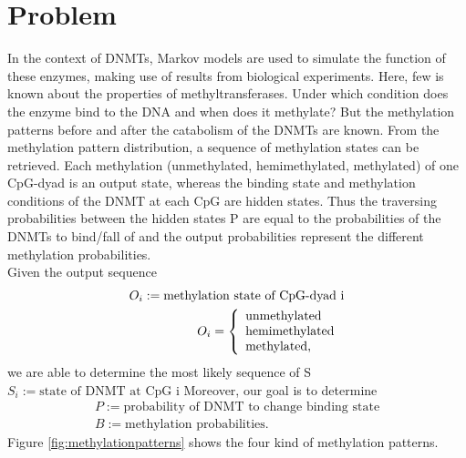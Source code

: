 \section{Problem} 
\label{section:Problem}
In the context of \acp{DNMT}, Markov models are used to simulate the function of these enzymes, making use of results from biological experiments. Here, few is known about the properties of methyltransferases. Under which condition does the enzyme bind to the DNA and when does it methylate? But the methylation patterns before and after the catabolism of the \acp{DNMT} are known. From the methylation pattern distribution, a sequence of methylation states can be retrieved. Each methylation (unmethylated, hemimethylated, methylated) of one \ac{CpG}-dyad is an output state, whereas the binding state and methylation conditions of the \ac{DNMT} at each \ac{CpG} are hidden states. Thus the traversing probabilities between the hidden states P are equal to the probabilities of the \acp{DNMT} to bind/fall of and the output probabilities represent the different methylation probabilities.\\
Given the output sequence\newline
\begin{align}
O_i := \text{methylation state of CpG-dyad i}\\
O_i = \left\{
\begin{array}{l}
\text{unmethylated} \\
\text{hemimethylated} \\
\text{methylated,}
\end{array}
\right.\newline
\end{align}
we are able to determine the most likely sequence of S\newline
$S_i := \text{state of DNMT at CpG i}$\newline
Moreover, our goal is to determine\newline
\begin{align}
P := \text{probability of DNMT to change binding state}\\
B := \text{methylation probabilities.}
\end{align}
Figure \ref{fig:methylationpatterns} shows the four kind of methylation patterns.\\
